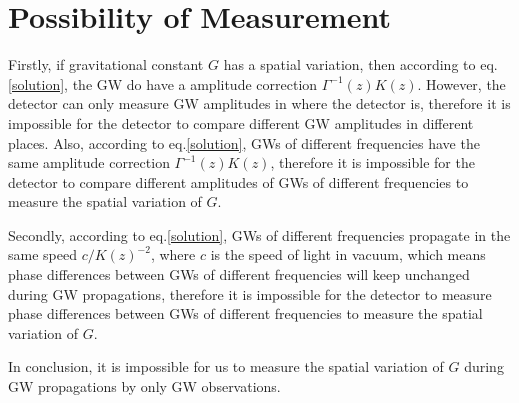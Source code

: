 \documentclass[
    jor,
    amsmath,amssymb,preprint,
    superscriptaddress,
]{revtex4-2}
\begin{document}
\section{Possibility of Measurement}

Firstly, if gravitational constant $G$ has a spatial variation, then according to eq.\eqref{solution}, the GW do have a amplitude correction $\Gamma^{-1}(z){K}(z)$. However, the detector can only measure GW amplitudes in where the detector is, therefore it is impossible for the detector to compare different GW amplitudes in different places. Also, according to eq.\eqref{solution}, GWs of different frequencies have the same amplitude correction $\Gamma^{-1}(z){K}(z)$, therefore it is impossible for the detector to compare different amplitudes of GWs of different frequencies to measure the spatial variation of $G$.

Secondly, according to eq.\eqref{solution}, GWs of different frequencies propagate in the same speed $c/{K}(z)^{-2}$, where $c$ is the speed of light in vacuum, which means phase differences between GWs of different frequencies will keep unchanged during GW propagations, therefore it is impossible for the detector to measure phase differences between GWs of different frequencies to measure the spatial variation of $G$.

In conclusion, it is impossible for us to measure the spatial variation of $G$ during GW propagations by only GW observations.


\end{document}
